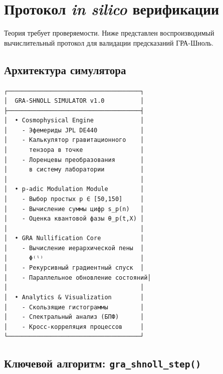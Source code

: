\documentclass[12pt,a4paper]{article}
\theoremstyle{plain}
\theoremstyle{definition}
\theoremstyle{remark}
\begin{document}
\section{Протокол \textit{in silico} верификации}
\label{sec:verification}

Теория требует проверяемости. Ниже представлен воспроизводимый вычислительный протокол для валидации предсказаний ГРА-Шноль.

\subsection{Архитектура симулятора}

\begin{lstlisting}[caption={Структура модулей симулятора}, label={lst:simulator-arch}]
┌─────────────────────────────────────┐
│  GRA-SHNOLL SIMULATOR v1.0          │
├─────────────────────────────────────┤
│  • Cosmophysical Engine             │
│    - Эфемериды JPL DE440            │
│    - Калькулятор гравитационного    │
│      тензора в точке                │
│    - Лоренцевы преобразования       │
│      в систему лаборатории          │
│                                     │
│  • p-adic Modulation Module         │
│    - Выбор простых p ∈ [50,150]     │
│    - Вычисление суммы цифр s_p(n)   │
│    - Оценка квантовой фазы θ_p(t,X) │
│                                     │
│  • GRA Nullification Core           │
│    - Вычисление иерархической пены  │
│      Φ⁽ˡ⁾                           │
│    - Рекурсивный градиентный спуск  │
│    - Параллельное обновление состояний│
│                                     │
│  • Analytics & Visualization        │
│    - Скользящие гистограммы         │
│    - Спектральный анализ (БПФ)      │
│    - Кросс-корреляция процессов     │
└─────────────────────────────────────┘
\end{lstlisting}

\subsection{Ключевой алгоритм: \texttt{gra\_shnoll\_step()}}
\end{document}
